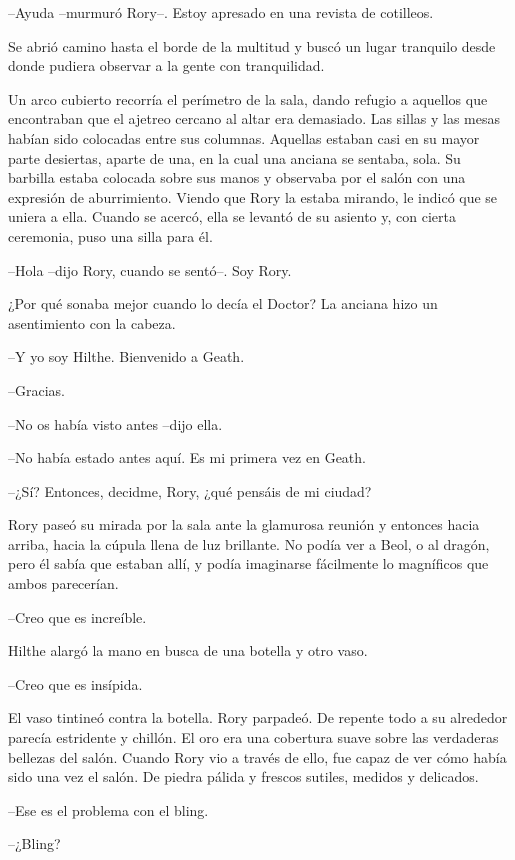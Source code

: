 {--Ayuda --murmuró Rory--. Estoy apresado en una revista de
cotilleos.}

{Se abrió camino hasta el borde de la multitud y buscó un lugar
tranquilo desde donde pudiera observar a la gente con tranquilidad.}

{Un arco cubierto recorría el perímetro de la sala, dando refugio a
	aquellos que encontraban que el ajetreo cercano al altar era demasiado.
	Las sillas y las mesas habían sido colocadas entre sus columnas.
	Aquellas estaban casi en su mayor parte desiertas, aparte de una, en la
	cual una anciana se sentaba, sola. Su barbilla estaba colocada sobre sus
	manos y observaba por el salón con una expresión de aburrimiento. Viendo
	que Rory la estaba mirando, le indicó que se uniera a ella. Cuando se
	acercó, ella se levantó de su asiento y, con cierta ceremonia, puso una
silla para él.}

{--Hola --dijo Rory, cuando se sentó--. Soy Rory.}

{¿Por qué sonaba mejor cuando lo decía el Doctor? La anciana hizo un
asentimiento con la cabeza.}

{--Y yo soy Hilthe. Bienvenido a Geath.}

{--Gracias.}

{--No os había visto antes --dijo ella.}

{--No había estado antes aquí. Es mi primera vez en Geath.}

{--¿Sí? Entonces, decidme, Rory, ¿qué pensáis de mi ciudad?}

{Rory paseó su mirada por la sala ante la glamurosa reunión y entonces
	hacia arriba, hacia la cúpula llena de luz brillante. No podía ver a
	Beol, o al dragón, pero él sabía que estaban allí, y podía imaginarse
fácilmente lo magníficos que ambos parecerían.}

{--Creo que es increíble.}

{Hilthe alargó la mano en busca de una botella y otro vaso.}

{--Creo que es insípida.}

{El vaso tintineó contra la botella. Rory parpadeó. De repente todo a su
	alrededor parecía estridente y chillón. El oro era una cobertura suave
	sobre las verdaderas bellezas del salón. Cuando Rory vio a través de
	ello, fue capaz de ver cómo había sido una vez el salón. De piedra
pálida y frescos sutiles, medidos y delicados.}

{--Ese es el problema con el bling.}

{--¿Bling?}

